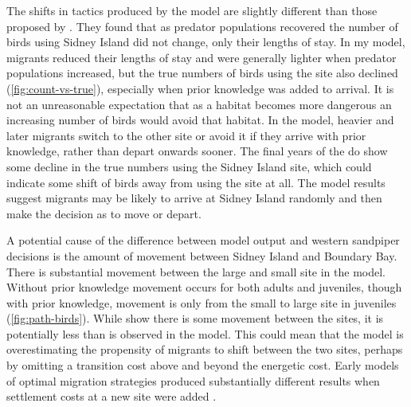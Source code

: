 The shifts in tactics produced by the model are slightly different than those proposed by \citet{ydenberg_western_2004}. They found that as predator populations recovered the number of birds using Sidney Island did not change, only their lengths of stay. In my model, migrants reduced their lengths of stay and were generally lighter when predator populations increased, but the true numbers of birds using the site also declined (\autoref{fig:count-vs-true}), especially when prior knowledge was added to arrival. It is not an unreasonable expectation that as a habitat becomes more dangerous an increasing number of birds would avoid that habitat. In the model, heavier and later migrants switch to the other site or avoid it if they arrive with prior knowledge, rather than depart onwards sooner. The final years of the \citet{ydenberg_western_2004} do show some decline in the true numbers using the Sidney Island site, which could indicate some shift of birds away from using the site at all. The model results suggest migrants may be likely to arrive at Sidney Island randomly and then make the decision as to move or depart.

 A potential cause of the difference between model output and western sandpiper decisions is the amount of movement between Sidney Island and Boundary Bay. There is substantial movement between the large and small site in the model. Without prior knowledge movement occurs for both adults and juveniles, though with prior knowledge, movement is only from the small to large site in juveniles (\autoref{fig:path-birds}). While \citet{Ydenberg2002} show there is some movement between the sites, it is potentially less than is observed in the model. This could mean that the model is overestimating the propensity of migrants to shift between the two sites, perhaps by omitting a transition cost above and beyond the energetic cost.  Early models of optimal migration strategies produced substantially different results when settlement costs at a new site were added \citep{Alerstam1990}. 



